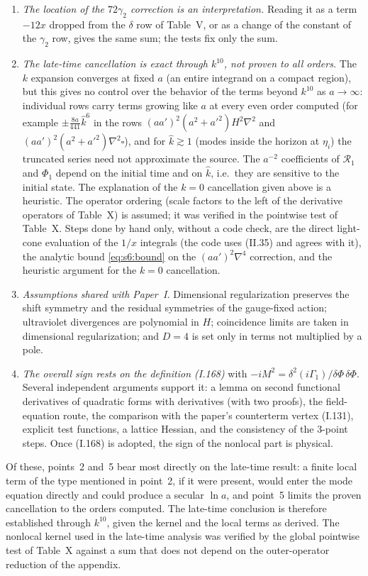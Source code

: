 \documentclass[aps,prd,onecolumn,10pt,nofootinbib,floatfix]{revtex4-2}
\newcommand{\eqI}[1]{(I.#1)}
\newcommand{\eqII}[1]{(II.#1)}
\begin{document}
\begin{enumerate}
among fifteen candidate densities at $D=4,5,6$, with general-$D$ formulas derived for eleven of them; and the pointwise check of the
nonlocal part of \eqI{60}--\eqI{67} at $D=4$.
\item \emph{The location of the $72\gamma_2$ correction is an interpretation.} Reading it as a term $-12x$ dropped from the $\delta$
row of Table~V, or as a change of the constant of the $\gamma_2$ row, gives the same sum; the tests fix only the sum.
\item \emph{The late-time cancellation is exact through $k^{10}$, not proven to all orders.} The $k$ expansion converges at fixed $a$
(an entire integrand on a compact region), but this gives no control over the behavior of the terms beyond $k^{10}$ as $a\to\infty$:
individual rows carry terms growing like $a$ at every even order computed (for example $\pm\frac{8a}{441}\hat k^6$ in the rows
$(aa')^2(a^2+a'^2)H^2\nabla^2$ and $(aa')^2(a^2+a'^2)\nabla^2\square$), and for $\hat k\gtrsim1$ (modes inside the horizon at $\eta_i$) the
truncated series need not approximate the source. The $a^{-2}$ coefficients of $\mathcal R_1$ and $\Phi_1$ depend on the initial time
and on $\hat k$, i.e.\ they are sensitive to the initial state. The explanation of the $k=0$ cancellation given above is a heuristic.
The operator ordering (scale factors to the left of the derivative operators of Table~X) is assumed; it was verified in the pointwise
test of Table~X\@. Steps done by hand only, without a code check, are the direct light-cone evaluation of the $1/x$ integrals (the code
uses \eqII{35} and agrees with it), the analytic bound \eqref{eq:s6:bound} on the $(aa')^2\nabla^4$ correction, and the heuristic
argument for the $k=0$ cancellation.
\item \emph{Assumptions shared with Paper~I.} Dimensional regularization preserves the shift symmetry and the residual symmetries of
the gauge-fixed action; ultraviolet divergences are polynomial in $H$; coincidence limits are taken in dimensional regularization; and
$D=4$ is set only in terms not multiplied by a pole.
\item \emph{The overall sign rests on the definition \eqI{168}} with $-iM^2=\delta^2(i\Gamma_1)/\delta\Phi\,\delta\Phi$. Several
independent arguments support it: a lemma on second functional derivatives of quadratic forms with derivatives (with two proofs), the
field-equation route, the comparison with the paper's counterterm vertex \eqI{131}, explicit test functions, a lattice Hessian, and
the consistency of the 3-point steps. Once \eqI{168} is adopted, the sign of the nonlocal part is physical.
\end{enumerate}
Of these, points~2 and~5 bear most directly on the late-time result: a finite local term of the type mentioned in point~2, if it
were present, would enter the mode equation directly and could produce a secular $\ln a$, and point~5 limits the proven cancellation to
the orders computed. The late-time conclusion is therefore established through $k^{10}$, given the kernel and the local terms as
derived. The nonlocal
kernel used in the late-time analysis was verified by the global pointwise test of Table~X against a sum that does not depend on the
outer-operator reduction of the appendix.
\end{document}
